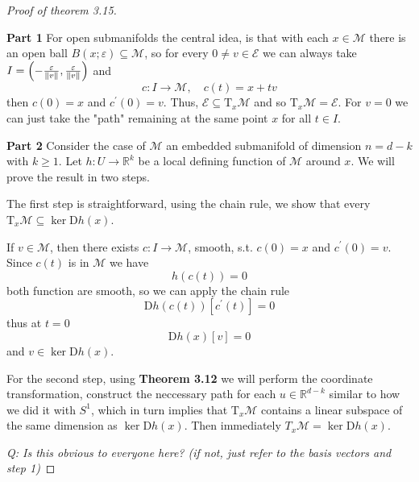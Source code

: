 \documentclass[12pt]{article}
\newcommand*{\T}{\mathrm{T}}
\newcommand*{\D}{\mathrm{D}}
\theoremstyle{definition}
\begin{document}
\begin{proof}[Proof of theorem 3.15]
$ $ 

\noindent \textbf{Part 1} For open submanifolds the central idea, is that with each $x \in \mathcal{M}$ there is an open ball $B(x; \varepsilon) \subseteq \mathcal{M}$, so for every $0 \neq v \in \mathcal{E}$ we can always take $I = \left(-\frac{\varepsilon}{\norm{v}}, \frac{\varepsilon}{\norm{v}}\right)$ and 
\begin{equation}
    c : I \to \mathcal{M}, \quad c(t) = x + tv 
\end{equation}
then $c(0) = x$ and $c^\prime(0) = v$. Thus, $\mathcal{E} \subseteq \T_x \mathcal{M}$ and so $\T_x \mathcal{M} = \mathcal{E}$. For $v = 0$ we can just take the "path" remaining at the same point $x$ for all $t \in I$. 

\noindent \textbf{Part 2} Consider the case of $\mathcal{M}$ an embedded submanifold of dimension $n = d - k$ with $k \geq 1$. Let $h: U \to \mathbb{R}^k$ be a local defining function of $\mathcal{M}$ around $x$. We will prove the result in two steps. 

The first step is straightforward, using the chain rule, we show that every $\T_x \mathcal{M} \subseteq \ker \D h(x)$. 

If $v \in \mathcal{M}$, then there exists $c : I \to \mathcal{M}$, smooth, s.t. $c(0) = x$ and $c^\prime(0) = v$. Since $c(t)$ is in $\mathcal{M}$ we have 
\begin{equation}
    h(c(t)) = 0
\end{equation}
both function are smooth, so we can apply the chain rule 
\begin{equation}
    \D h(c(t))[c^\prime (t)] = 0
\end{equation}
thus at $t = 0$ 
\begin{equation}
    \D h(x)[v] = 0
\end{equation}
and $v \in \ker \D h(x)$.

For the second step, using \textbf{Theorem 3.12} we will perform the coordinate transformation, construct the neccessary path for each $u \in \mathbb{R}^{d-k}$ similar to how we did it with $S^{1}$, which in turn implies that $\T_x \mathcal{M}$ contains a linear subspace of the same dimension as $\ker \D h(x)$. Then immediately $T_x \mathcal{M} = \ker \D h(x)$. 

\textit{Q: Is this obvious to everyone here? (if not, just refer to the basis vectors and step 1)}


\end{proof}
\end{document}
